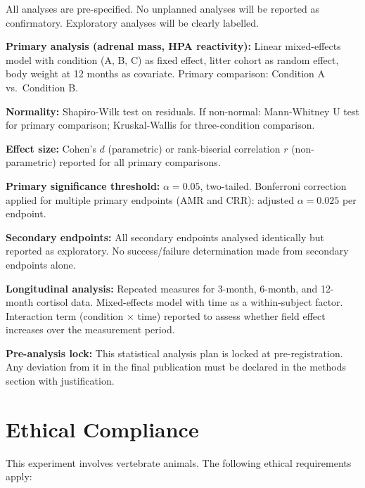 \documentclass[10pt, a4paper]{article}
\begin{document}
All analyses are pre-specified. No unplanned
analyses will be reported as confirmatory.
Exploratory analyses will be clearly labelled.

\textbf{Primary analysis (adrenal mass, HPA
reactivity):}
Linear mixed-effects model with condition
(A, B, C) as fixed effect, litter cohort as
random effect, body weight at 12 months
as covariate. Primary comparison:
Condition A vs.\ Condition B.

\textbf{Normality:}
Shapiro-Wilk test on residuals.
If non-normal: Mann-Whitney U test for
primary comparison; Kruskal-Wallis for
three-condition comparison.

\textbf{Effect size:}
Cohen's $d$ (parametric) or rank-biserial
correlation $r$ (non-parametric) reported
for all primary comparisons.

\textbf{Primary significance threshold:}
$\alpha = 0.05$, two-tailed.
Bonferroni correction applied for multiple
primary endpoints (AMR and CRR):
adjusted $\alpha = 0.025$ per endpoint.

\textbf{Secondary endpoints:}
All secondary endpoints analysed identically
but reported as exploratory. No success/failure
determination made from secondary endpoints
alone.

\textbf{Longitudinal analysis:}
Repeated measures for 3-month, 6-month,
and 12-month cortisol data. Mixed-effects
model with time as a within-subject factor.
Interaction term (condition $\times$ time)
reported to assess whether field effect
increases over the measurement period.

\textbf{Pre-analysis lock:}
This statistical analysis plan is locked at
pre-registration. Any deviation from it
in the final publication must be declared
in the methods section with justification.

\section{Ethical Compliance}
\label{sec:ethics}

This experiment involves vertebrate animals.
The following ethical requirements apply:
\end{document}

